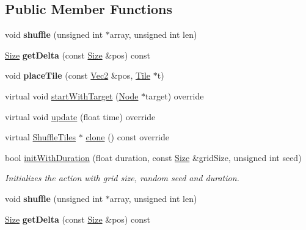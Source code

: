 \subsection*{Public Member Functions}
\begin{DoxyCompactItemize}
\item 
\mbox{\label{classShuffleTiles_acf015c3f2b1e6d52c1a62a6f6e0c4a24}} 
void {\bfseries shuffle} (unsigned int $\ast$array, unsigned int len)
\item 
\mbox{\label{classShuffleTiles_aadcfcd9c5c219e36dd2c3dec04c437ca}} 
\hyperlink{classSize}{Size} {\bfseries get\+Delta} (const \hyperlink{classSize}{Size} \&pos) const
\item 
\mbox{\label{classShuffleTiles_a79541397bcf2dea69515f3919cc7b48d}} 
void {\bfseries place\+Tile} (const \hyperlink{classVec2}{Vec2} \&pos, \hyperlink{structTile}{Tile} $\ast$t)
\item 
virtual void \hyperlink{classShuffleTiles_aa5b245843f208ba8300d6eb302937163}{start\+With\+Target} (\hyperlink{classNode}{Node} $\ast$target) override
\item 
virtual void \hyperlink{classShuffleTiles_a045829c657840301dc75208581fb5d94}{update} (float time) override
\item 
virtual \hyperlink{classShuffleTiles}{Shuffle\+Tiles} $\ast$ \hyperlink{classShuffleTiles_aedd65e1a5cad0797a3d7cf30366e7de8}{clone} () const override
\item 
bool \hyperlink{classShuffleTiles_a7050f01cdfb27989f37117cad08dfa70}{init\+With\+Duration} (float duration, const \hyperlink{classSize}{Size} \&grid\+Size, unsigned int seed)
\begin{DoxyCompactList}\small\item\em Initializes the action with grid size, random seed and duration. \end{DoxyCompactList}\item 
\mbox{\label{classShuffleTiles_acf015c3f2b1e6d52c1a62a6f6e0c4a24}} 
void {\bfseries shuffle} (unsigned int $\ast$array, unsigned int len)
\item 
\mbox{\label{classShuffleTiles_aadcfcd9c5c219e36dd2c3dec04c437ca}} 
\hyperlink{classSize}{Size} {\bfseries get\+Delta} (const \hyperlink{classSize}{Size} \&pos) const

\end{DoxyCompactItemize}
